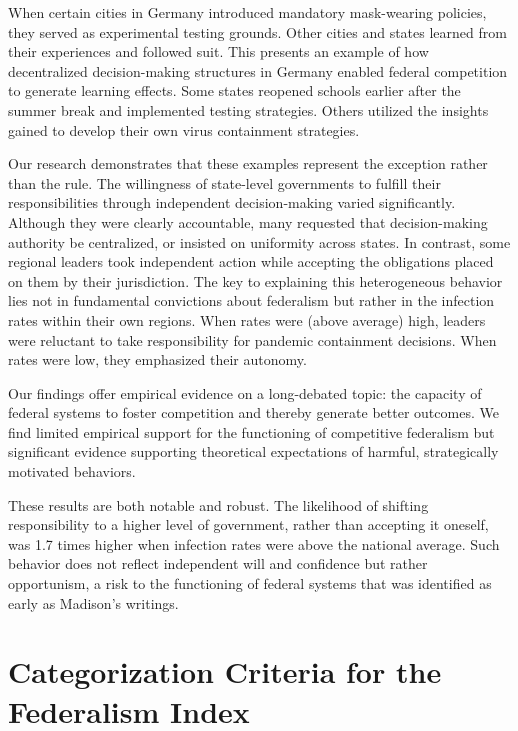 \documentclass[authoryear,12pt, 3p]{elsarticle} %
\theoremstyle{break}
\begin{document}
When certain cities in Germany introduced mandatory mask-wearing policies, they served as experimental testing grounds. Other cities and states learned from their experiences and followed suit. This presents an example of how decentralized decision-making structures in Germany enabled federal competition to generate learning effects. Some states reopened schools earlier after the summer break and implemented testing strategies. Others utilized the insights gained to develop their own virus containment strategies.

Our research demonstrates that these examples represent the exception rather than the rule. The willingness of state-level governments to fulfill their responsibilities through independent decision-making varied significantly. Although they were clearly accountable, many requested that decision-making authority be centralized, or insisted on uniformity across states. In contrast, some regional leaders took independent action while accepting the obligations placed on them by their jurisdiction. The key to explaining this heterogeneous behavior lies not in fundamental convictions about federalism but rather in the infection rates within their own regions. When rates were (above average) high, leaders were reluctant to take responsibility for pandemic containment decisions. When rates were low, they emphasized their autonomy.

Our findings offer empirical evidence on a long-debated topic: the capacity of federal systems to foster competition and thereby generate better outcomes. We find limited empirical support for the functioning of competitive federalism but significant evidence supporting theoretical expectations of harmful, strategically motivated behaviors.

These results are both notable and robust. The likelihood of shifting responsibility to a higher level of government, rather than accepting it oneself, was 1.7 times higher when infection rates were above the national average. Such behavior does not reflect independent will and confidence but rather opportunism, a risk to the functioning of federal systems that was identified as early as Madison's writings.

\appendix

\section{Categorization Criteria for the Federalism Index}\label{app.category}

\end{document}
